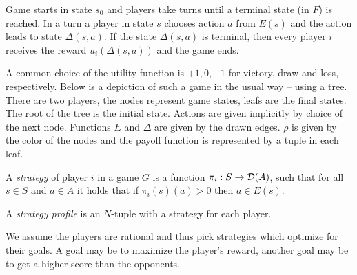 Game starts in state $s_0$ and players take turns until
a terminal state (in $F$) is reached. In a turn a player in state $s$
chooses action $a$ from $E(s)$ and the action leads to state
$\Delta(s,a)$.  If the state $\Delta(s,a)$ is terminal, then every
player $i$ receives the reward $u_i(\Delta(s,a))$ and the game ends.

\begin{example}
A common choice of the utility function is $+1, 0, -1$ for victory, draw
and loss, respectively. Below is a depiction of such a game
in the usual way -- using a tree.
There are two players,
the nodes represent game states, leafs are the final states.
The root of the tree is the initial state.
Actions are given implicitly by choice of the next node.
Functions $E$ and $\Delta$ are given by the drawn edges.
$\rho$ is given by the color of the nodes
and the payoff function is represented by a tuple in each leaf.

\begin{center}
\end{center}
\end{example}


\begin{definition}
    A {\em strategy} of player $i$ in a game $G$ is a function
    $\pi_i : S \to \mathcal{D}(A)$, such that for all $s \in S$ and $a
    \in A$ it holds that if $\pi_i(s)(a) > 0$ then $a \in E(s)$.

    A {\em strategy profile} is an $N$-tuple with a strategy for each player.
\end{definition}

We assume the players are rational and thus pick strategies which
optimize for their goals. A goal may be to maximize the player's reward,
another goal may be to get a higher score than the opponents.

